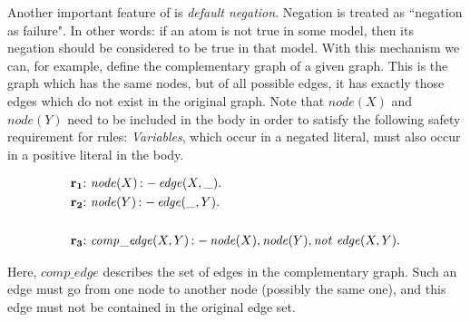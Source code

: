 \documentclass[a4paper, titlepage]{article}
\DeclareMathOperator{\leftimpl}{:-}
\DeclareMathOperator{\nott}{\mathit{not}}
\newcommand{\rowprefix}[1]{%
  \ensuremath{\color{black}\mathbf{#1{:}}\ }%
}
\begin{document}
Another important feature of \dlvhex{} is \emph{default 
negation}. Negation is treated as ``negation as failure". 
In other words: if an atom is not true in some model, then 
its negation should be considered to be true in that model. 
With this mechanism we can, for example, define the 
complementary graph of a given graph. This is the graph 
which has the same nodes, but of all possible edges, it has 
exactly those edges which do not exist in the original 
graph. Note that $\mathit{node}(X)$ and $\mathit{node}(Y)$ 
need to be included in the body in order to satisfy the 
following safety requirement for rules: \emph{Variables}, 
which occur in a negated literal, must also occur in a 
positive literal in the body.
\begin{exmp}
\begin{align*}
\rowprefix{r_1}& \mathit{node}(X) \leftimpl \mathit{edge}(X, \_).
\\
\rowprefix{r_2}& \mathit{node}(Y) \leftimpl \mathit{edge}(\_, Y). 
\\ \\
\rowprefix{r_3}& \mathit{comp\_edge}(X, Y) \leftimpl 
\mathit{node}(X), \mathit{node}(Y), \nott \thinspace \mathit{ 
edge }(X, Y). 
\end{align*}
\end{exmp}
Here, $\mathit{comp\_edge}$ describes the set of edges in 
the complementary graph. Such an edge must go from one node 
to another node (possibly the same one), and this edge must 
not be contained in the original edge set. 
\end{document}
